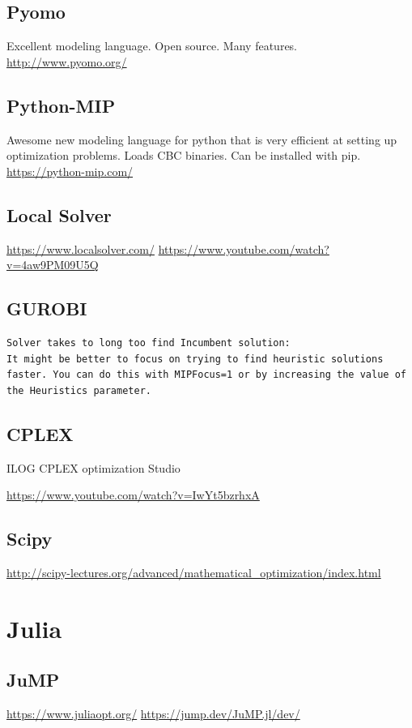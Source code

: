 \documentclass[letter,12pt]{book}
\renewcommand{\0}{\mathbf{0}}
\begin{document}
\subsection{Pyomo}
Excellent modeling language.  Open source.  Many features.
\url{http://www.pyomo.org/}

\subsection{Python-MIP}
Awesome new modeling language for python that is very efficient at setting up optimization problems.  Loads CBC binaries.  Can be installed with pip.
\url{https://python-mip.com/}


\subsection{Local Solver}

\url{https://www.localsolver.com/}
\url{https://www.youtube.com/watch?v=4aw9PM09U5Q}

\subsection{GUROBI}

\begin{verbatim}
Solver takes to long too find Incumbent solution:
It might be better to focus on trying to find heuristic solutions faster. You can do this with MIPFocus=1 or by increasing the value of the Heuristics parameter.
\end{verbatim}

\subsection{CPLEX}

ILOG CPLEX optimization Studio

\url{https://www.youtube.com/watch?v=IwYt5bzrhxA}



\subsection{Scipy}

\url{http://scipy-lectures.org/advanced/mathematical_optimization/index.html}

\section{Julia}
\subsection{JuMP}
\url{https://www.juliaopt.org/}
\url{https://jump.dev/JuMP.jl/dev/}
\end{document}
